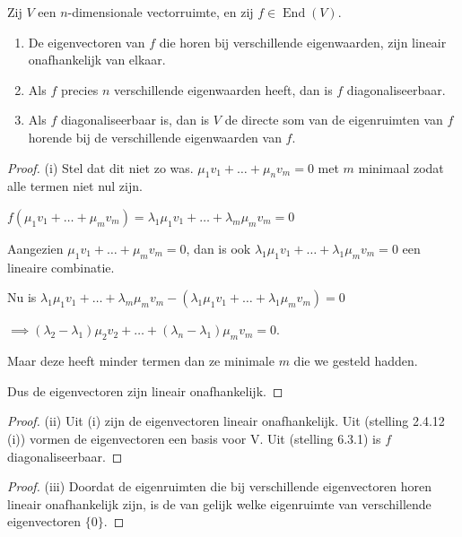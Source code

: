 \begin{stelling}[6.3.4]
    Zij $V$ een $n$-dimensionale vectorruimte, en zij $f \in \operatorname{End}(V)$.
    \begin{enumerate}
        \item[(i)] De eigenvectoren van $f$ die horen bij verschillende eigenwaarden, zijn lineair onafhankelijk van elkaar.
        \item[(ii)] Als $f$ precies $n$ verschillende eigenwaarden heeft, dan is $f$ diagonaliseerbaar.
        \item[(iii)] Als $f$ diagonaliseerbaar is, dan is $V$ de directe som van de eigenruimten van $f$ horende bij de verschillende eigenwaarden van $f$.
    \end{enumerate}
\end{stelling}
\begin{proof}(i)
    Stel dat dit niet zo was. \(\mu_1v_1 + \dots + \mu_n v_m = 0\) met \(m\) minimaal zodat alle termen niet nul zijn.


    \(f(\mu_1v_1 + \dots + \mu_m v_m ) = \lambda_1 \mu_1 v_1 + \dots + \lambda_m \mu_m v_m = 0\)

    Aangezien \(\mu_1v_1 + \dots + \mu_m v_m = 0\), dan is ook \(\lambda_1\mu_1v_1 + \dots + \lambda_1\mu_m v_m = 0\) een lineaire combinatie.

    Nu is \( \lambda_1 \mu_1 v_1 + \dots + \lambda_m \mu_m v_m - (\lambda_1\mu_1v_1 + \dots + \lambda_1\mu_m v_m) = 0 \)

    \(\implies (\lambda_2-\lambda_1)\mu_2 v_2 + \dots + (\lambda_n-\lambda_1)\mu_m v_m = 0 \).

    Maar deze heeft minder termen dan ze minimale \(m\) die we gesteld hadden.

    Dus de eigenvectoren zijn lineair onafhankelijk.

\end{proof}
\begin{proof}(ii)
    Uit (i) zijn de eigenvectoren lineair onafhankelijk. Uit (stelling 2.4.12 (i)) vormen de eigenvectoren een basis voor V.
    Uit (stelling 6.3.1) is \(f\) diagonaliseerbaar.
\end{proof}
\begin{proof}(iii)
    Doordat de eigenruimten die bij verschillende eigenvectoren horen lineair onafhankelijk zijn,
    is de van gelijk welke eigenruimte van verschillende eigenvectoren \(\{0\}\).
\end{proof}
